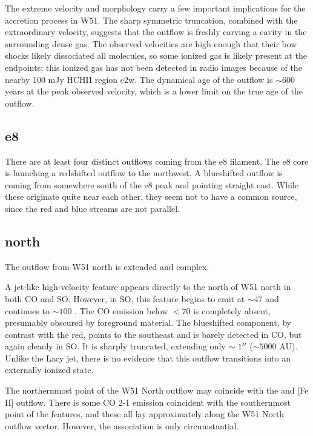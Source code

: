 \documentclass{aa}
\begin{document}
The extreme velocity and morphology carry a few important implications for the
accretion process in W51.  The sharp symmetric truncation, combined with the
extraordinary velocity, suggests that the outflow is freshly carving a cavity
in the surrounding dense gas.  The observed velocities are high enough that
their bow shocks likely dissociated all molecules, so some ionized gas is
likely present at the endpoints; this ionized gas has not been detected in
radio images because of the nearby 100 mJy HCHII region e2w.  The dynamical age
of the outflow is $\sim600$ years at the peak observed velocity, which is a
lower limit on the true age of the outflow.

\subsection{e8}
There are at least four distinct outflows coming from the e8 filament.
The e8 core is launching a redshifted outflow to the northwest.  A blueshifted
outflow is coming from somewhere south of the e8 peak and pointing straight
east.  While these originate quite near each other, they seem not to have
a common source, since the red and blue streams are not parallel.

\subsection{north}
The outflow from W51 north is extended and complex.

A jet-like high-velocity feature appears directly to the north of W51 north in
both CO and SO.  However, in SO, this feature begins to emit at $\sim47$ \kms
and continues to $\sim 100$ \kms.  The CO emission below $<70$ \kms is
completely absent, presumably obscured by foreground material.  The blueshifted
component, by contrast with the red, points to the southeast and is barely
detected in CO, but again cleanly in SO.  It is sharply truncated, extending
only $\sim1 \mbox{$^{\prime\prime}$}$ ($\sim5000$ AU).  Unlike the Lacy jet, there is no
evidence that this outflow transitions into an externally ionized state.

The northernmost point of the W51 North outflow may coincide with
the \citet{Hodapp2002a} \hh and [Fe II] outflow.  There is some CO 2-1
emission coincident with the southernmost point of the \hh features,
and these all lay approximately along the W51 North outflow vector.
However, the association is only circumstantial.
\end{document}
